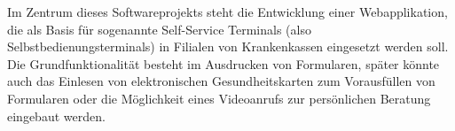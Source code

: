 Im Zentrum dieses Softwareprojekts steht die Entwicklung einer Webapplikation, die als Basis für sogenannte Self-\/\+Service Terminals (also Selbstbedienungsterminals) in Filialen von Krankenkassen eingesetzt werden soll. Die Grundfunktionalität besteht im Ausdrucken von Formularen, später könnte auch das Einlesen von elektronischen Gesundheitskarten zum Vorausfüllen von Formularen oder die Möglichkeit eines Videoanrufs zur persönlichen Beratung eingebaut werden. 